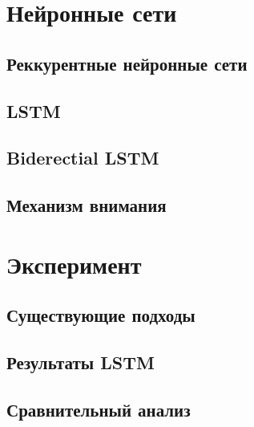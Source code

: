 \section{Нейронные сети}
    \subsection{Реккурентные нейронные сети}
    \subsection{LSTM}
    \subsection{Biderectial LSTM}
    \subsection{Механизм внимания}
\clearpage

\section{Эксперимент}
    \subsection{Существующие подходы}
    \subsection{Результаты LSTM}
    \subsection{Сравнительный анализ}
\clearpage